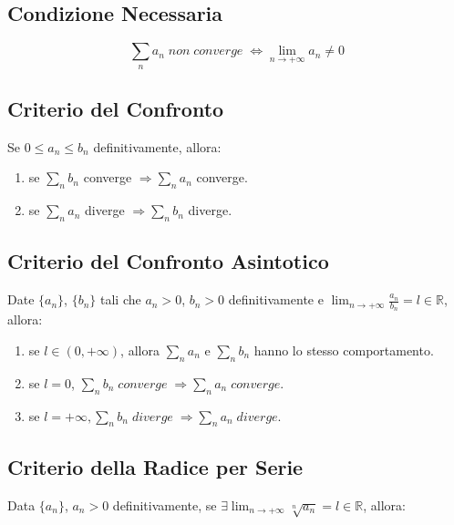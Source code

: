 \documentclass{article}
\begin{document}
\subsection{Condizione Necessaria}

\begin{equation*}
    \displaystyle \sum_{n} a_n \; non \; converge \; \Leftrightarrow \displaystyle \lim_{n \to + \infty} a_n \neq 0
\end{equation*}

\subsection{Criterio del Confronto}

Se $0 \leq a_n \leq b_n$ definitivamente, allora:

\begin{enumerate}
    \item se $\displaystyle \sum_{n} b_n$ converge $\Rightarrow \displaystyle \sum_{n} a_n$ converge.
    \item se $\displaystyle \sum_{n} a_n$ diverge $\Rightarrow \displaystyle \sum_{n} b_n$ diverge.
\end{enumerate}

\subsection{Criterio del Confronto Asintotico}

Date $\{a_n\}$, $\{b_n\}$ tali che $a_n > 0$, $b_n > 0$ definitivamente e $\displaystyle \lim_{n \to + \infty} \frac{a_n}{b_n} = l \in \mathbb{R}$, allora:

\begin{enumerate}
    \item se $l \in (0, + \infty)$, allora $\displaystyle \sum_n a_n$ e $\displaystyle \sum_n b_n$ hanno lo stesso comportamento.
    \item se $l = 0$, $\displaystyle \sum_n b_n \; converge \; \Rightarrow \sum_n a_n \; converge$.
    \item se $l = + \infty, \sum_n b_n \; diverge \; \Rightarrow \sum_n a_n \; diverge$.
\end{enumerate}

\subsection{Criterio della Radice per Serie}

Data $\{a_n\}$, $a_n > 0$ definitivamente, se $\exists \displaystyle \lim_{n \to + \infty} \sqrt[n]{a_n} = l \in \mathbb{R}$, allora:
\end{document}
